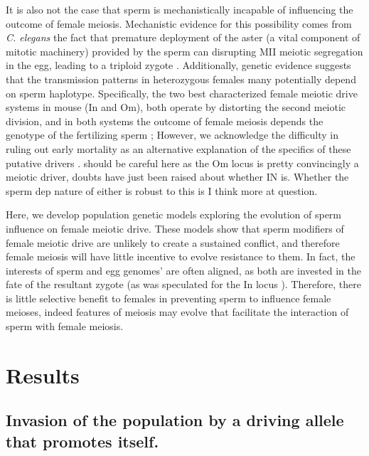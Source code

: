 \documentclass[12pt,letterpaper]{article}
\newcommand{\gc}[1]{{ \color{red} #1}}
\begin{document}
It is also not the case that sperm is mechanistically incapable of influencing the outcome of female meiosis.
Mechanistic evidence for this possibility comes from
\emph{C. elegans} the fact that premature deployment of the aster (a vital component of mitotic
machinery) provided by the sperm can disrupting MII meiotic segregation
in the egg, leading to a triploid zygote \citep{McNally2012}. 
Additionally, genetic evidence suggests that the transmission patterns
in heterozygous females many potentially depend on sperm haplotype. 
Specifically, the two best characterized female meiotic drive systems in mouse (In and Om), both operate by distorting the second meiotic division, 
and in both systems the outcome of female meiosis depends the genotype of the fertilizing sperm \citep{Agulnik1993,Wu2005}; 
However,  we acknowledge the difficulty in ruling out early mortality
as an alternative explanation of the 
specifics of these putative drivers \citep[Give page numbers to
discussion of this in][]{Burt2006}. \gc{should be careful here as the
  Om locus is pretty convincingly a meiotic driver, doubts have just
  been raised about whether IN is. Whether the sperm dep nature of
  either is robust to this is I think more at question.}


Here, we develop population genetic models exploring the evolution of sperm influence on female meiotic drive. 
These models show that sperm modifiers of female meiotic drive are
unlikely to create a sustained conflict, and therefore 
female meiosis will have little incentive to evolve resistance to them.
In fact, the interests of sperm and egg  genomes' are often aligned, as both are invested in the fate of the resultant zygote (as was speculated for the In locus \citep{Pomiankowski1993}).
Therefore, there is little selective benefit to females in preventing sperm to influence female meioses,
	indeed features of meiosis may evolve that facilitate the interaction of sperm with female meiosis. 

\section*{Results}

\subsection*{ Invasion of the population by a driving allele that promotes
itself.}
\end{document}
